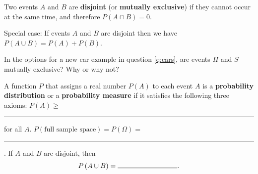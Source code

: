 





\clearpage


\bbox
\begin{definition}
Two events $A$ and $B$ are \textbf{disjoint} (or \textbf{mutually exclusive}) if they cannot occur at the same time, and therefore $P(A \cap B) = 0$.
\smallskip

\alert{Special case:} If events $A$ and $B$ are disjoint then we have $P(A \cup B) = P(A)+P(B)$.
\end{definition}
\ebox



\bb[resume]
\ii In the options for a new car example in question \ref{q:cars}, are events $H$ and $S$ mutually exclusive? Why or why not? \vfill

\ee

\bbox
\begin{definition}\label{def:prob-dist}
A function $P$ that assigns a real number $P(A)$ to each event $A$ is a \textbf{probability distribution} or a \textbf{probability measure} if it satisfies the following three axioms:
\bb
\ii $P(A) \geq$ \rule{0.1\tw}{0.5pt} for all $A$. \bs
\ii $P(\mbox{full sample space})=P(\Omega) =$ \rule{0.1\tw}{0.5pt} . \bs
\ii If $A$ and $B$ are disjoint, then
\[ P \left( A \cup B \right) = \mbox{\rule{0.25\tw}{0.5pt}}.\]
\ee
\end{definition}
\ebox

